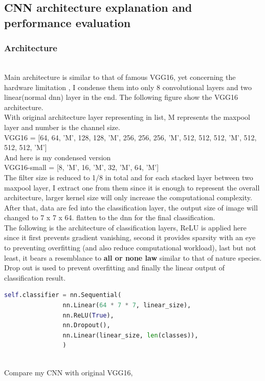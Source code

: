 \documentclass[11pt, a4paper]{article} %
\begin{document}
\subsection{CNN architecture explanation and performance evaluation} %
\subsubsection{Architecture}
\\ Main architecture is similar to that of famous VGG16, yet concerning the hardware limitation , I condense them into only 8 convolutional layers and two linear(normal dnn) layer in the end.   The following figure show the VGG16 architecture.
\\ \small{With original architecture layer representing in list, M represents the maxpool layer and number is the channel size.}
\\ VGG16 = [64, 64, 'M', 128, 128, 'M', 256, 256, 256, 'M', 512, 512, 512, 'M', 512, 512, 512, 'M']
\\ And here is my condensed version
\\ VGG16-small = [8, 'M', 16, 'M', 32, 'M', 64, 'M']
\\ The filter size is reduced to 1/8 in total and for each stacked layer between two maxpool layer, I extract one from them since it is enough to represent the overall architecture, larger kernel size will only increase the computational complexity. 
\\ After that, data are fed into the classification layer, the output size of image will changed to 7 x 7 x 64. flatten to the dnn for the final classification.
\\ The following is the architecture of classification layers, ReLU is applied here since it first prevents gradient vanishing, second it provides sparsity with an eye to preventing overfitting (and also reduce computational workload), last but not least, it bears a resemblance to \textbf{all or none law} similar to that of nature species. Drop out is used to prevent overfitting and finally the linear output of classification result.
\begin{lstlisting}[language = python]
self.classifier = nn.Sequential(
                nn.Linear(64 * 7 * 7, linear_size),
                nn.ReLU(True),
                nn.Dropout(),
                nn.Linear(linear_size, len(classes)),
                )
\end{lstlisting}
\\ Compare my CNN with original VGG16,   
\end{document}
